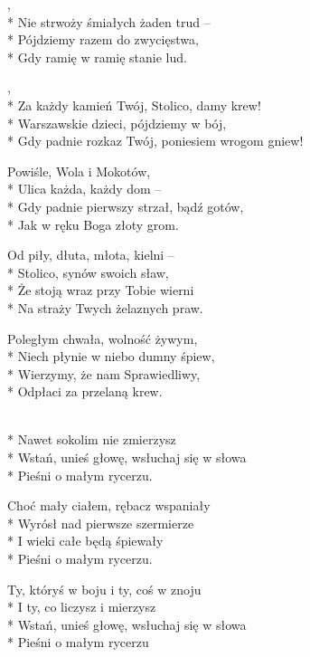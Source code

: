 \begin{lyrics}[longestline={Gdy padnie rozkaz Twój, poniesiem wrogom gniew!}]

,\\*
Nie strwoży śmiałych żaden trud --\\*
Pójdziemy razem do zwycięstwa,\\*
Gdy ramię w ramię stanie lud.

\begin{chorus}
,\\*
Za każdy kamień Twój, Stolico, damy krew!\\*
Warszawskie dzieci, pójdziemy w bój,\\*
Gdy padnie rozkaz Twój, poniesiem wrogom gniew!
\end{chorus}

Powiśle, Wola i Mokotów,\\*
Ulica każda, każdy dom --\\*
Gdy padnie pierwszy strzał, bądź gotów,\\*
Jak w ręku Boga złoty grom.

\chorusref

Od piły, dłuta, młota, kielni --\\*
Stolico, synów swoich sław,\\*
Że stoją wraz przy Tobie wierni\\*
Na straży Twych żelaznych praw.

\chorusref

Poległym chwała, wolność żywym,\\*
Niech płynie w niebo dumny śpiew,\\*
Wierzymy, że nam Sprawiedliwy,\\*
Odpłaci za przelaną krew.

\chorusref
\end{lyrics}




\begin{lyrics}[longestline={Wstań, unieś głowę, wsłuchaj się w słowa}]

\\*
Nawet sokolim nie zmierzysz\\*
Wstań, unieś głowę, wsłuchaj się w słowa\\*
Pieśni o małym rycerzu.

Choć mały ciałem, rębacz wspaniały\\*
Wyrósł nad pierwsze szermierze\\*
I wieki całe będą śpiewały\\*
Pieśni o małym rycerzu.

Ty, któryś w boju i ty, coś w znoju\\*
I ty, co liczysz i mierzysz\\*
Wstań, unieś głowę, wsłuchaj się w słowa\\*
Pieśni o małym rycerzu
\end{lyrics}



